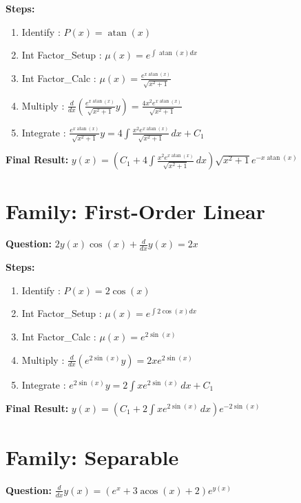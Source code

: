 \documentclass{article}
\begin{document}
\textbf{Steps:}
\begin{enumerate}
\item Identify :  $P(x) = \operatorname{atan}{\left(x \right)}$
\item Int Factor_Setup :  $\mu(x) = e^{\int \operatorname{atan}{\left(x \right)} dx}$
\item Int Factor_Calc :  $\mu(x) = \frac{e^{x \operatorname{atan}{\left(x \right)}}}{\sqrt{x^{2} + 1}}$
\item Multiply :  $\frac{d}{dx}(\frac{e^{x \operatorname{atan}{\left(x \right)}}}{\sqrt{x^{2} + 1}}y) = \frac{4 x^{2} e^{x \operatorname{atan}{\left(x \right)}}}{\sqrt{x^{2} + 1}}$
\item Integrate :  $\frac{e^{x \operatorname{atan}{\left(x \right)}}}{\sqrt{x^{2} + 1}}y = 4 \int \frac{x^{2} e^{x \operatorname{atan}{\left(x \right)}}}{\sqrt{x^{2} + 1}}\, dx + C_1$
\end{enumerate}
\textbf{Final Result:} $y{\left(x \right)} = \left(C_{1} + 4 \int \frac{x^{2} e^{x \operatorname{atan}{\left(x \right)}}}{\sqrt{x^{2} + 1}}\, dx\right) \sqrt{x^{2} + 1} e^{- x \operatorname{atan}{\left(x \right)}}$

\section*{Family: First-Order Linear}
\textbf{Question:} $2 y{\left(x \right)} \cos{\left(x \right)} + \frac{d}{d x} y{\left(x \right)} = 2 x$

\textbf{Steps:}
\begin{enumerate}
\item Identify :  $P(x) = 2 \cos{\left(x \right)}$
\item Int Factor_Setup :  $\mu(x) = e^{\int 2 \cos{\left(x \right)} dx}$
\item Int Factor_Calc :  $\mu(x) = e^{2 \sin{\left(x \right)}}$
\item Multiply :  $\frac{d}{dx}(e^{2 \sin{\left(x \right)}}y) = 2 x e^{2 \sin{\left(x \right)}}$
\item Integrate :  $e^{2 \sin{\left(x \right)}}y = 2 \int x e^{2 \sin{\left(x \right)}}\, dx + C_1$
\end{enumerate}
\textbf{Final Result:} $y{\left(x \right)} = \left(C_{1} + 2 \int x e^{2 \sin{\left(x \right)}}\, dx\right) e^{- 2 \sin{\left(x \right)}}$

\section*{Family: Separable}
\textbf{Question:} $\frac{d}{d x} y{\left(x \right)} = \left(e^{x} + 3 \operatorname{acos}{\left(x \right)} + 2\right) e^{y{\left(x \right)}}$
\end{document}
